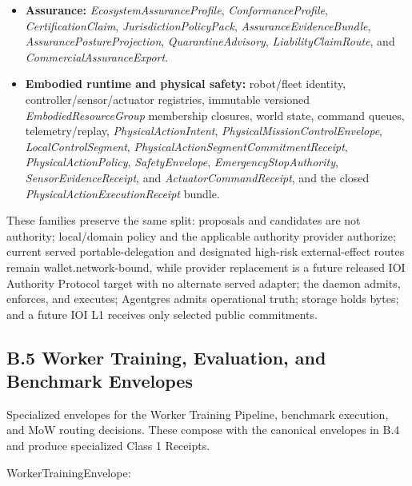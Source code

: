 \documentclass[
  11pt,
]{article}
\begin{document}
\begin{itemize}
  customer material and customer retention, replay, evaluation, memory/RAG,
  tuning, distillation, competing-model training, internal-package reuse,
  publication, and resale over outputs. Missing rights fail closed; multi-route
  output uses the intersection of contributing customer rights.
\item
  \textbf{Assurance:} \emph{EcosystemAssuranceProfile},
  \emph{ConformanceProfile}, \emph{CertificationClaim},
  \emph{JurisdictionPolicyPack}, \emph{AssuranceEvidenceBundle},
  \emph{AssurancePostureProjection}, \emph{QuarantineAdvisory},
  \emph{LiabilityClaimRoute}, and \emph{CommercialAssuranceExport}.
\item
  \textbf{Embodied runtime and physical safety:} robot/fleet identity,
  controller/sensor/actuator registries, immutable versioned
  \emph{EmbodiedResourceGroup} membership closures, world state, command
  queues, telemetry/replay, \emph{PhysicalActionIntent},
  \emph{PhysicalMissionControlEnvelope}, \emph{LocalControlSegment},
  \emph{PhysicalActionSegmentCommitmentReceipt},
  \emph{PhysicalActionPolicy}, \emph{SafetyEnvelope},
  \emph{EmergencyStopAuthority}, \emph{SensorEvidenceReceipt}, and
  \emph{ActuatorCommandReceipt}, and the closed
  \emph{PhysicalActionExecutionReceipt} bundle.
\end{itemize}

These families preserve the same split: proposals and candidates are not
authority; local/domain policy and the applicable authority provider authorize;
current served portable-delegation and designated high-risk external-effect
routes remain wallet.network-bound, while provider replacement is a future
released IOI Authority Protocol target with no alternate served adapter; the
daemon admits, enforces, and executes;
Agentgres admits operational truth; storage holds bytes; and a future IOI L1
receives only selected public commitments.
\hypertarget{b.5-worker-training-evaluation-and-benchmark-envelopes}{%
\subsection{B.5 Worker Training, Evaluation, and Benchmark
Envelopes}\label{b.5-worker-training-evaluation-and-benchmark-envelopes}}

Specialized envelopes for the Worker Training Pipeline, benchmark
execution, and MoW routing decisions. These compose with the canonical
envelopes in B.4 and produce specialized Class 1 Receipts.

WorkerTrainingEnvelope:
\end{document}
